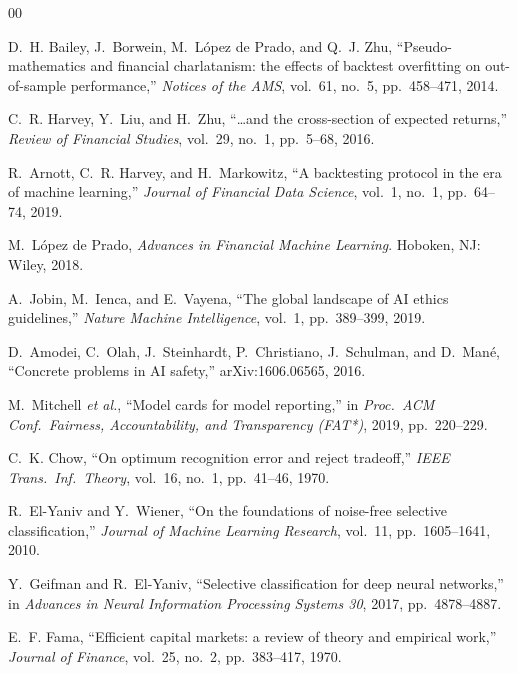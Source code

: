 \documentclass[conference]{IEEEtran}
\begin{document}
\begin{thebibliography}{00}

 D.~H. Bailey, J.~Borwein, M.~L\'opez de Prado, and Q.~J. Zhu,
``Pseudo-mathematics and financial charlatanism: the effects of backtest
overfitting on out-of-sample performance,'' \emph{Notices of the AMS}, vol.~61,
no.~5, pp.~458--471, 2014.

 C.~R. Harvey, Y.~Liu, and H.~Zhu, ``\ldots and the
cross-section of expected returns,'' \emph{Review of Financial Studies}, vol.~29,
no.~1, pp.~5--68, 2016.

 R.~Arnott, C.~R. Harvey, and H.~Markowitz, ``A backtesting
protocol in the era of machine learning,'' \emph{Journal of Financial Data
Science}, vol.~1, no.~1, pp.~64--74, 2019.

 M.~L\'opez de Prado, \emph{Advances in Financial Machine
Learning}. Hoboken, NJ: Wiley, 2018.

 A.~Jobin, M.~Ienca, and E.~Vayena, ``The global landscape of AI
ethics guidelines,'' \emph{Nature Machine Intelligence}, vol.~1, pp.~389--399,
2019.

 D.~Amodei, C.~Olah, J.~Steinhardt, P.~Christiano, J.~Schulman,
and D.~Man\'e, ``Concrete problems in AI safety,'' arXiv:1606.06565, 2016.

 M.~Mitchell \emph{et al.}, ``Model cards for model
reporting,'' in \emph{Proc.\ ACM Conf.\ Fairness, Accountability, and Transparency
(FAT*)}, 2019, pp.~220--229.

 C.~K. Chow, ``On optimum recognition error and reject
tradeoff,'' \emph{IEEE Trans.\ Inf.\ Theory}, vol.~16, no.~1, pp.~41--46, 1970.

 R.~El-Yaniv and Y.~Wiener, ``On the foundations of noise-free
selective classification,'' \emph{Journal of Machine Learning Research}, vol.~11,
pp.~1605--1641, 2010.

 Y.~Geifman and R.~El-Yaniv, ``Selective classification for
deep neural networks,'' in \emph{Advances in Neural Information Processing Systems
30}, 2017, pp.~4878--4887.

 E.~F. Fama, ``Efficient capital markets: a review of theory and
empirical work,'' \emph{Journal of Finance}, vol.~25, no.~2, pp.~383--417, 1970.


\end{thebibliography}
\end{document}
